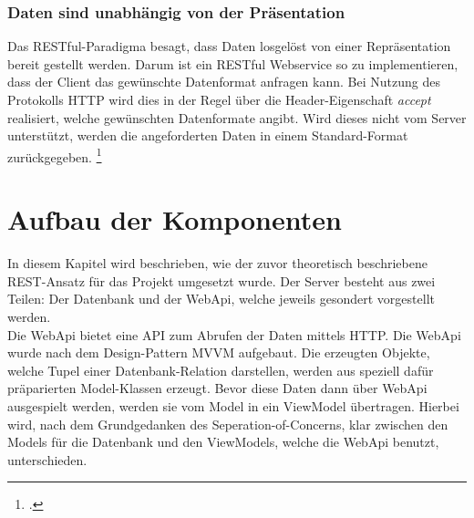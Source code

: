 \subsubsection*{Daten sind unabhängig von der Präsentation}
Das \ac{REST}ful-Paradigma besagt, dass Daten losgelöst von einer Repräsentation bereit gestellt werden. Darum ist ein \ac{REST}ful Webservice so zu implementieren, dass der Client das gewünschte Datenformat anfragen kann. Bei Nutzung des Protokolls HTTP wird dies in der Regel über die Header-Eigenschaft \textit{accept} realisiert, welche gewünschten Datenformate angibt. Wird dieses nicht vom Server unterstützt, werden die angeforderten Daten in einem Standard-Format zurückgegeben. \footcite[S. 26ff.]{REST-und-HTTP}
\section{Aufbau der Komponenten}
\label{sec:aufbau-Komponenten}
In diesem Kapitel wird beschrieben, wie der zuvor theoretisch beschriebene \ac{REST}-Ansatz für das Projekt umgesetzt wurde. Der Server besteht aus zwei Teilen: Der Datenbank und der WebApi, welche jeweils gesondert vorgestellt werden. \\
Die WebApi bietet eine \ac{API} zum Abrufen der Daten mittels \ac{HTTP}. Die WebApi wurde nach dem Design-Pattern \ac{MVVM} aufgebaut. Die erzeugten Objekte, welche Tupel einer Datenbank-Relation darstellen, werden aus speziell dafür präparierten Model-Klassen erzeugt. Bevor diese Daten dann über WebApi ausgespielt werden, werden sie vom Model in ein ViewModel übertragen. Hierbei wird, nach dem Grundgedanken des \gls{Seperation-of-Concerns}, klar zwischen den Models für die Datenbank und den ViewModels, welche die WebApi benutzt, unterschieden.
